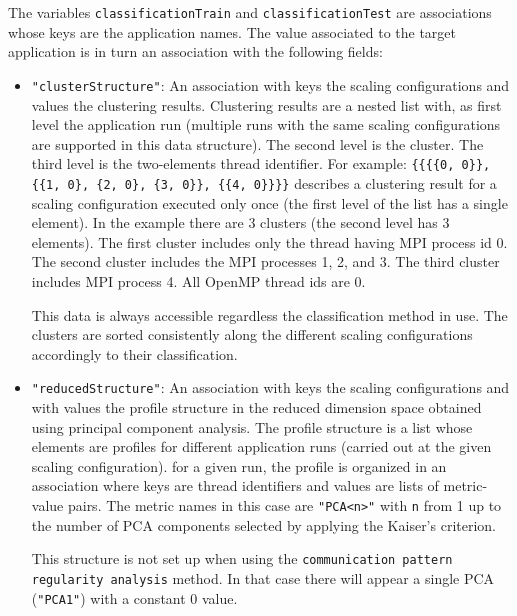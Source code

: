 \documentclass[a4paper, 10pt]{article}
\begin{document}
The variables \texttt{classificationTrain} and \texttt{classificationTest} are \mathe associations whose keys are
the application names. The value associated to the target application is in turn an association with the following fields:
\begin{itemize}
 \item \verb!"clusterStructure"!: An association with keys the scaling configurations and values the clustering results.
 Clustering results are a nested list with, as first level the application run
 (multiple runs with the same scaling configurations are supported in this data structure). The second level is the cluster.
 The third level is the two-elements thread identifier.
 For example: \verb!{{{{0, 0}}, {{1, 0}, {2, 0}, {3, 0}}, {{4, 0}}}}! describes a clustering result for a scaling configuration executed only once
 (the first level of the list has a single element). In the example there are 3 clusters (the second level has 3 elements). The first
 cluster includes only the thread having MPI process id 0. The second cluster includes the MPI processes 1, 2, and 3. The third cluster includes
 MPI process 4. All OpenMP thread ids are 0.
 
 This data is always accessible regardless the classification method in use. The clusters are sorted consistently
 along the different scaling configurations
 accordingly to their classification.
 
 \item \verb!"reducedStructure"!: An association with keys the scaling configurations and with values the profile structure
 in the reduced dimension space obtained using principal component analysis. The profile structure is a list whose elements are
 profiles for different application runs (carried out at the given scaling configuration). for a given run, the profile is organized in an
 association where keys are thread identifiers and values are lists of metric-value pairs. The metric names in this case are \verb!"PCA<n>"!
 with \texttt{n} from 1 up to the number of PCA components selected by applying the Kaiser's criterion.
 
 This structure is not set up when using the \texttt{communication pattern regularity analysis} method. In that case there will appear a single
 PCA (\verb!"PCA1"!) with a constant 0 value.
 

\end{itemize}
\end{document}
